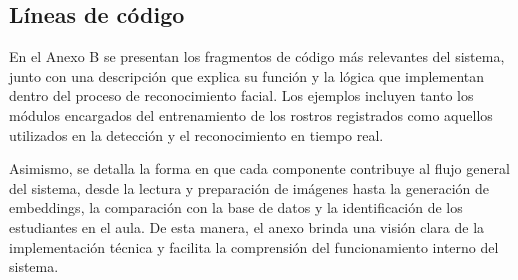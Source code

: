 \subsection{Líneas de código}

En el Anexo B se presentan los fragmentos de código más relevantes del sistema, junto con una descripción que explica su función y la lógica que implementan dentro del proceso de reconocimiento facial. Los ejemplos incluyen tanto los módulos encargados del entrenamiento de los rostros registrados como aquellos utilizados en la detección y el reconocimiento en tiempo real.

Asimismo, se detalla la forma en que cada componente contribuye al flujo general del sistema, desde la lectura y preparación de imágenes hasta la generación de embeddings, la comparación con la base de datos y la identificación de los estudiantes en el aula. De esta manera, el anexo brinda una visión clara de la implementación técnica y facilita la comprensión del funcionamiento interno del sistema.

